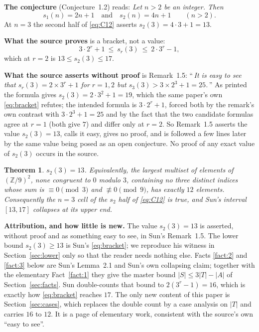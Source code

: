 \documentclass[11pt]{amsart}
\newtheorem{theorem}{Theorem}
\newcommand{\ZZ}{\mathbb Z}
\begin{document}
\smallskip
\noindent\textbf{The conjecture} (Conjecture~1.2) reads: \emph{Let $n>2$ be an
integer. Then}
\begin{equation}\label{eq:C12}
  s_1(n)=2n+1
  \quad\text{and}\quad
  s_2(n)=4n+1
  \qquad(n>2).
\end{equation}
At $n=3$ the second half of \eqref{eq:C12} asserts $s_2(3)=4\cdot3+1=13$.

\smallskip
\noindent\textbf{What the source proves} is a bracket, not a value:
\begin{equation}\label{eq:bracket}
  3\cdot2^r+1\ \le\ s_r(3)\ \le\ 2\cdot3^r-1,
\end{equation}
which at $r=2$ is $13\le s_2(3)\le17$.

\smallskip
\noindent\textbf{What the source asserts without proof} is Remark~1.5:
``\,\emph{It is easy to see that
$s_r(3)=2\times3^r+1$ for $r=1,2$ but $s_3(3)>3\times2^3+1=25$.}\,'' As printed
the formula gives $s_2(3)=2\cdot3^2+1=19$, which the same paper's own
\eqref{eq:bracket} refutes; the intended formula is $3\cdot2^r+1$, forced both
by the remark's own contrast with $3\cdot2^3+1=25$ and by the fact that the two
candidate formulas agree at $r=1$ (both give $7$) and differ only at $r=2$. So
Remark~1.5 asserts the value $s_2(3)=13$, calls it easy, gives no proof, and is
followed a few lines later by the same value being posed as an open conjecture.
No proof of any exact value of $s_2(3)$ occurs in the source.

\begin{theorem}\label{thm:main}
$s_2(3)=13$. Equivalently, the largest multiset of elements of
$(\ZZ/9)^2$, none congruent to $0$ modulo $3$, containing no three distinct
indices whose sum is $\equiv0\pmod 3$ and $\not\equiv0\pmod 9$, has exactly
$12$ elements. Consequently the $n=3$ cell of the $s_2$ half of
\eqref{eq:C12} is true, and Sun's interval $[13,17]$ collapses at its upper end.
\end{theorem}

\noindent\textbf{Attribution, and how little is new.}
The value $s_2(3)=13$ is asserted, without proof and as something easy to see,
in Sun's Remark~1.5. The lower bound $s_2(3)\ge13$ is Sun's \eqref{eq:bracket};
we reproduce his witness in Section~\ref{sec:lower} only so that the reader needs
nothing else. Facts \ref{fact:2} and \ref{fact:3} below are Sun's Lemma~2.1 and
Sun's own collapsing claim; together with the elementary Fact~\ref{fact:1} they
give the master bound $|S|\le3|T|-|A|$ of Section~\ref{sec:facts}. Sun
double-counts that bound to $2(3^r-1)=16$, which is exactly how
\eqref{eq:bracket} reaches $17$. The only new content of this paper is
Section~\ref{sec:cases}, which replaces the double count by a case analysis on
$|T|$ and carries $16$ to $12$. It is a page of elementary work, consistent with
the source's own ``easy to see''.
\end{document}
